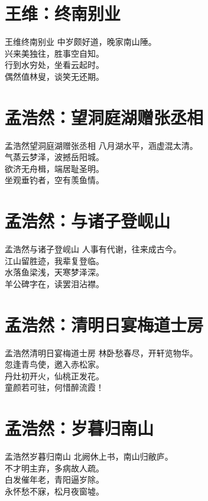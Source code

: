 \documentclass[12pt,oneside,a5paper]{book}
\begin{document}
\chapter{王维：终南别业}
\begin{poemzh}{王维}{终南别业}
中岁颇好道，晚家南山陲。\\
兴来美独往，胜事空自知。\\
行到水穷处，坐看云起时。\\
偶然值林叟，谈笑无还期。\\ 
\end{poemzh}

\chapter{孟浩然：望洞庭湖赠张丞相}
\begin{poemzh}{孟浩然}{望洞庭湖赠张丞相}
八月湖水平，涵虚混太清。\\
气蒸云梦泽，波撼岳阳城。\\
欲济无舟楫，端居耻圣明。\\
坐观垂钓者，空有羡鱼情。\\ 
\end{poemzh}

\chapter{孟浩然：与诸子登岘山}
\begin{poemzh}{孟浩然}{与诸子登岘山}
人事有代谢，往来成古今。\\
江山留胜迹，我辈复登临。\\
水落鱼梁浅，天寒梦泽深。\\
羊公碑字在，读罢泪沾襟。\\ 
\end{poemzh}

\chapter{孟浩然：清明日宴梅道士房}
\begin{poemzh}{孟浩然}{清明日宴梅道士房}
林卧愁春尽，开轩览物华。\\
忽逢青鸟使，邀入赤松家。\\
丹灶初开火，仙桃正发花。\\
童颜若可驻，何惜醉流霞！\\ 
\end{poemzh}

\chapter{孟浩然：岁暮归南山}
\begin{poemzh}{孟浩然}{岁暮归南山}
北阙休上书，南山归敝庐。\\
不才明主弃，多病故人疏。\\
白发催年老，青阳逼岁除。\\
永怀愁不寐，松月夜窗墟。\\ 
\end{poemzh}
\end{document}

